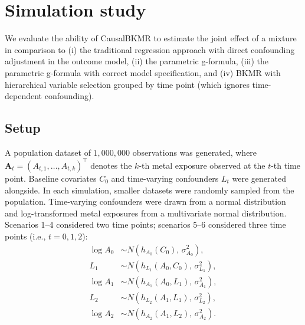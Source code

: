 
\section*{Simulation study}

We evaluate the ability of CausalBKMR to estimate the joint effect of a mixture in comparison to (i) the traditional regression approach with direct confounding adjustment in the outcome model, (ii) the parametric g-formula, (iii) the parametric g-formula with correct model specification, and (iv) BKMR with hierarchical variable selection grouped by time point (which ignores time-dependent confounding).

\subsection*{Setup}

A population dataset of $1{,}000{,}000$ observations was generated, where $\mathbf{A}_t = (A_{t,1}, \ldots, A_{t,k})^\top$ denotes the $k$-th metal exposure observed at the $t$-th time point. Baseline covariates $C_0$ and time-varying confounders $L_t$ were generated alongside. In each simulation, smaller datasets were randomly sampled from the population. Time-varying confounders were drawn from a normal distribution and log-transformed metal exposures from a multivariate normal distribution. Scenarios 1--4 considered two time points; scenarios 5--6 considered three time points (i.e., $t = 0, 1, 2$):
\begin{align*}
    \log A_0 &\sim N\!\left(h_{A_0}(C_0),\, \sigma^2_{A_0}\right), \\
    L_1 &\sim N\!\left(h_{L_1}(A_0, C_0),\, \sigma^2_{L_1}\right), \\
    \log A_1 &\sim N\!\left(h_{A_1}(A_0, L_1),\, \sigma^2_{A_1}\right), \\
    L_2 &\sim N\!\left(h_{L_2}(A_1, L_1),\, \sigma^2_{L_2}\right), \\
    \log A_2 &\sim N\!\left(h_{A_2}(A_1, L_2),\, \sigma^2_{A_2}\right).
\end{align*}

